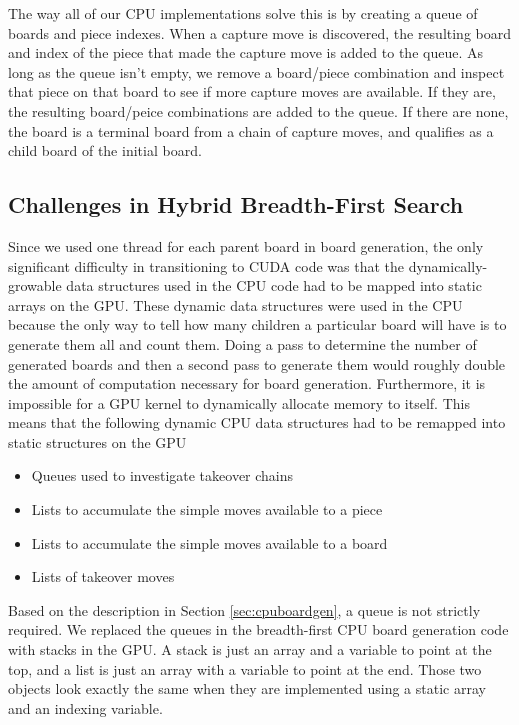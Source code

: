 \documentclass[11pt]{article}
\begin{document}
The way all of our CPU implementations solve this is by creating a queue of
boards and piece indexes. When a capture move is discovered, the resulting
board and index of the piece that made the capture move is added to the queue.
As long as the queue isn't empty, we remove a board/piece combination and
inspect that piece on that board to see if more capture moves are available. If
they are, the resulting board/peice combinations are added to the queue. If 
there are none, the board is a terminal board from a chain of capture moves,
and qualifies as a child board of the initial board.

\subsection{Challenges in Hybrid Breadth-First Search}
\label{sec:hybridbfschallenges}
Since we used one thread for each parent board in board generation, the only
significant difficulty in transitioning to CUDA code was that the
dynamically-growable data structures used in the CPU code had to be mapped into
static arrays on the GPU. These dynamic data structures were used in the CPU
because the only way to tell how many children a particular board will have is
to generate them all and count them. Doing a pass to determine the number of
generated boards and then a second pass to generate them would roughly double
the amount of computation necessary for board generation.  Furthermore, it is
impossible for a GPU kernel to dynamically allocate memory to itself. This means
that the following dynamic CPU data structures had to be remapped into static
structures on the GPU

\begin{itemize}
  \item{Queues used to investigate takeover chains}
  \item{Lists to accumulate the simple moves available to a piece}
  \item{Lists to accumulate the simple moves available to a board}
  \item{Lists of takeover moves}
\end{itemize}

Based on the description in Section \ref{sec:cpuboardgen}, a queue is not
strictly required. We replaced the queues in the breadth-first CPU board generation code
with stacks in the GPU. A stack is just an array and a variable to point at the
top, and a list is just an array with a variable to point at the end. Those two
objects look exactly the same when they are implemented using a static array
and an indexing variable.
\end{document}
